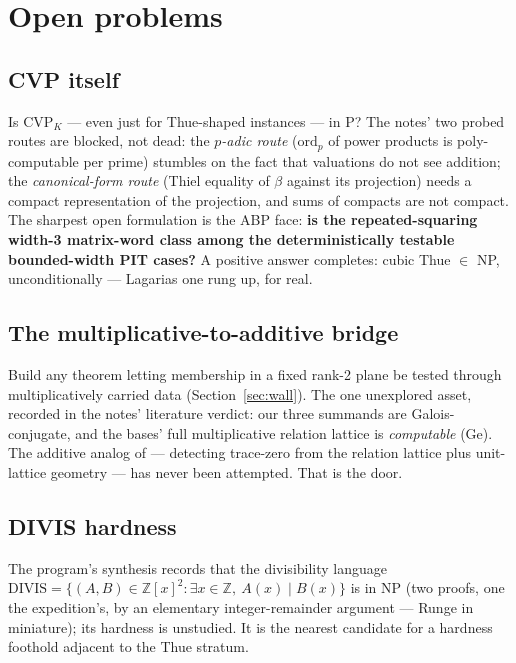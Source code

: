 \documentclass[11pt]{amsart}
\theoremstyle{plain}
\theoremstyle{remark}
\begin{document}
\section{Open problems}\label{sec:open}

\subsection{CVP itself}\label{sec:cvpopen}

Is $\mathrm{CVP}_K$ --- even just for Thue-shaped instances --- in P?
The notes' two probed routes are blocked, not dead: the \emph{$p$-adic
route} ($\mathrm{ord}_p$ of power products is poly-computable per
prime) stumbles on the fact that valuations do not see addition; the
\emph{canonical-form route} (Thiel equality of $\beta$ against its
projection) needs a compact representation of the projection, and
sums of compacts are not compact. The sharpest open formulation is
the ABP face: \textbf{is the repeated-squaring width-3 matrix-word
class among the deterministically testable bounded-width PIT cases?}
A positive answer completes: cubic Thue $\in$ NP, unconditionally ---
Lagarias one rung up, for real.

\subsection{The multiplicative-to-additive bridge}\label{sec:bridge}

Build any theorem letting membership in a fixed rank-2 plane be
tested through multiplicatively carried data
(Section~\ref{sec:wall}). The one unexplored asset, recorded in the
notes' literature verdict: our three summands are Galois-conjugate,
and the bases' full multiplicative relation lattice is
\emph{computable} (Ge). The additive analog of
\cite[Lemma~166]{vG25} --- detecting trace-zero from the relation
lattice plus unit-lattice geometry --- has never been attempted. That
is the door.

\subsection{DIVIS hardness}\label{sec:divis}

The program's synthesis records that the divisibility language
$\mathrm{DIVIS} = \{(A, B) \in \mathbb{Z}[x]^2 : \exists x \in
\mathbb{Z},\ A(x) \mid B(x)\}$ is in NP (two proofs, one the
expedition's, by an elementary integer-remainder argument --- Runge
in miniature); its hardness is unstudied. It is the nearest candidate
for a hardness foothold adjacent to the Thue stratum.
\end{document}
